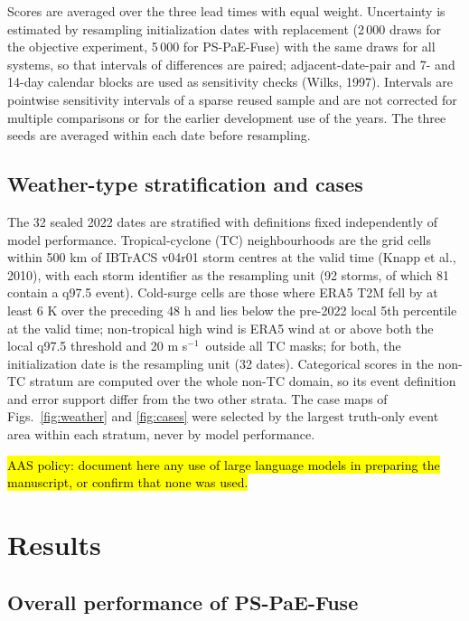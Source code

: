 \documentclass[12pt]{article}
\newcommand{\todo}[1]{\hl{#1}}
\newcommand{\mps}{m s$^{-1}$}
\begin{document}
Scores are averaged over the three lead times with equal weight. Uncertainty is estimated by resampling initialization dates with replacement (2\,000 draws for the objective experiment, 5\,000 for PS-PaE-Fuse) with the same draws for all systems, so that intervals of differences are paired; adjacent-date-pair and 7- and 14-day calendar blocks are used as sensitivity checks (Wilks, 1997). Intervals are pointwise sensitivity intervals of a sparse reused sample and are not corrected for multiple comparisons or for the earlier development use of the years. The three seeds are averaged within each date before resampling.

\subsection{Weather-type stratification and cases}
\label{sec:strata}

The 32 sealed 2022 dates are stratified with definitions fixed independently of model performance. Tropical-cyclone (TC) neighbourhoods are the grid cells within 500 km of IBTrACS v04r01 storm centres at the valid time (Knapp et al., 2010), with each storm identifier as the resampling unit (92 storms, of which 81 contain a q97.5 event). Cold-surge cells are those where ERA5 T2M fell by at least 6 K over the preceding 48 h and lies below the pre-2022 local 5th percentile at the valid time; non-tropical high wind is ERA5 wind at or above both the local q97.5 threshold and 20 \mps\ outside all TC masks; for both, the initialization date is the resampling unit (32 dates). Categorical scores in the non-TC stratum are computed over the whole non-TC domain, so its event definition and error support differ from the two other strata. The case maps of Figs.~\ref{fig:weather} and \ref{fig:cases} were selected by the largest truth-only event area within each stratum, never by model performance.

\todo{AAS policy: document here any use of large language models in preparing the manuscript, or confirm that none was used.}

\section{Results}
\label{sec:results}

\subsection{Overall performance of PS-PaE-Fuse}
\label{sec:overall}
\end{document}
